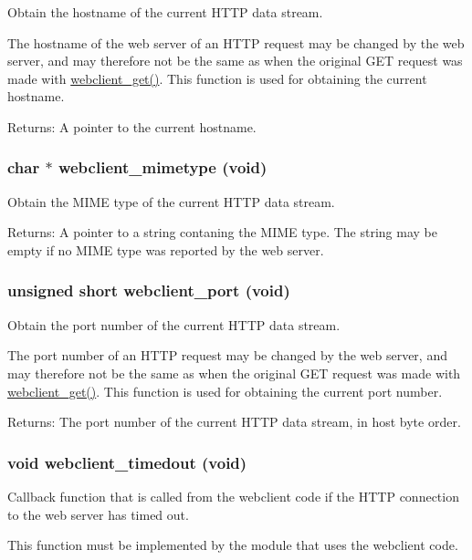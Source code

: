 Obtain the hostname of the current HTTP data stream. 

The hostname of the web server of an HTTP request may be changed by the web server, and may therefore not be the same as when the original GET request was made with \hyperlink{a00079_gf9385ef9ecc74c7d53ff2f15e62bfde3}{webclient\_\-get()}. This function is used for obtaining the current hostname.

\begin{Desc}
\item[Returns:]A pointer to the current hostname. \end{Desc}
\hypertarget{a00079_g4433d3af16ea083a81576d0f18ba57c9}{
\subsubsection[webclient\_\-mimetype]{\setlength{\rightskip}{0pt plus 5cm}char $\ast$ webclient\_\-mimetype (void)}}
\label{a00079_g4433d3af16ea083a81576d0f18ba57c9}


Obtain the MIME type of the current HTTP data stream. 

\begin{Desc}
\item[Returns:]A pointer to a string contaning the MIME type. The string may be empty if no MIME type was reported by the web server. \end{Desc}
\hypertarget{a00079_g2a939aa4fcffabbce1dc1f784a7e0ad3}{
\subsubsection[webclient\_\-port]{\setlength{\rightskip}{0pt plus 5cm}unsigned short webclient\_\-port (void)}}
\label{a00079_g2a939aa4fcffabbce1dc1f784a7e0ad3}


Obtain the port number of the current HTTP data stream. 

The port number of an HTTP request may be changed by the web server, and may therefore not be the same as when the original GET request was made with \hyperlink{a00079_gf9385ef9ecc74c7d53ff2f15e62bfde3}{webclient\_\-get()}. This function is used for obtaining the current port number.

\begin{Desc}
\item[Returns:]The port number of the current HTTP data stream, in host byte order. \end{Desc}
\hypertarget{a00079_g23705efb9077187881f094fc9be13bde}{
\subsubsection[webclient\_\-timedout]{\setlength{\rightskip}{0pt plus 5cm}void webclient\_\-timedout (void)}}
\label{a00079_g23705efb9077187881f094fc9be13bde}


Callback function that is called from the webclient code if the HTTP connection to the web server has timed out. 

This function must be implemented by the module that uses the webclient code. 